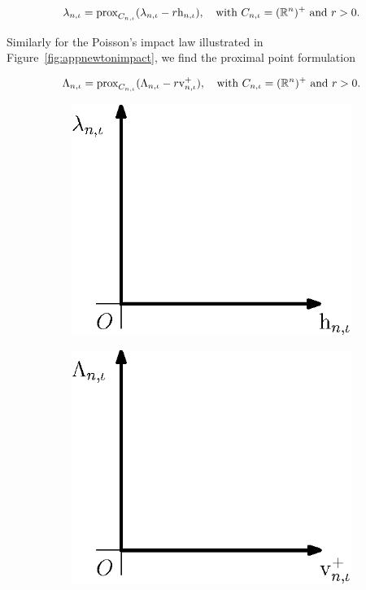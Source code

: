 \documentclass[../DC2019003Bouma.tex]{subfiles}
\begin{document}
\begin{align}
\lambda_{n,\iota} = \operatorname{\text{prox}}_{C_{n,\iota}}(\lambda_{n,\iota} - r\mathrm{h}_{n,\iota}),\quad \text{with }C_{n,\iota} = (\mathbb{R}^n)^+\text{ and } r>0.
\end{align}

Similarly for the Poisson's impact law illustrated in Figure~\ref{fig:appnewtonimpact}, we find the proximal point formulation

\begin{align}
\Lambda_{n,\iota} = \operatorname{\text{prox}}_{C_{n,\iota}}(\Lambda_{n,\iota} - r\mathrm{v}^+_{n,\iota}),\quad \text{with }C_{n,\iota} = (\mathbb{R}^n)^+\text{ and } r>0.
\end{align}

\begin{figure}[bt!]
\centering
\begin{subfigure}{0.3\textwidth}
\centering
\includegraphics[width=\linewidth]{signorinicontact.eps}
\caption{}\label{fig:appsignorinicontact}
\end{subfigure}
\qquad
\begin{subfigure}{0.3\textwidth}
\centering
\includegraphics[width=\linewidth]{newtonimpact.eps}

\end{subfigure}
\end{figure}
\end{document}
